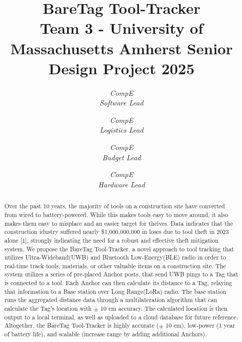 \documentclass[conference]{IEEEtran}
\begin{document}
\title{BareTag Tool-Tracker\\
{\footnotesize {Team 3 - University of Massachusetts Amherst Senior Design Project 2025 }}
}

\author{
\textit{CompE}\\
\textit{Software Lead}

\and
{}
\textit{CompE}\\
\textit{Logistics Lead}

\and
{}
\textit{CompE}\\
\textit{Budget Lead}

\and
{}
\textit{CompE}\\
\textit{Hardware Lead}

}

\maketitle

\begin{abstract}
    Over the past 10 years, the majority of tools on a construction 
    site have converted from wired to battery-powered. While this 
    makes tools easy to move around, it also makes them easy to misplace
    and an easier target for theives. Data indicates that the construction
    idustry suffered nearly \$1,000,000,000 in loses due to tool theft in
    2023 alone [1], strongly indicating the need for a robust and effective 
    theft mitigation system. We propose the BareTag Tool-Tracker, a novel
    approach to tool tracking that utilizes Ultra-Wideband(UWB) and Bluetooth 
    Low-Energy(BLE) radio in order to real-time track tools, materials, or other 
    valuable items on a construction site. The system utilizes a series
    of pre-placed Anchor posts, that send UWB pings to a Tag that is connected
    to a tool. Each Anchor can then calculate its distance to a Tag, relaying
    that information to a Base station over Long Range(LoRa) radio. The 
    base station runs the aggregated distance data through a multilateration
    algorithm that can calculate the Tag's location with $\pm$ 10 cm accuracy.
    The calculated location is then output to a local terminal, as well as 
    uploaded to a cloud database for future reference. Altogether, the BareTag Tool-Tracker
    is highly accurate ($\pm$ 10 cm), low-power (1 year of battery life), and
    scalable (increase range by adding additional Anchors).
\end{abstract}
\end{document}
